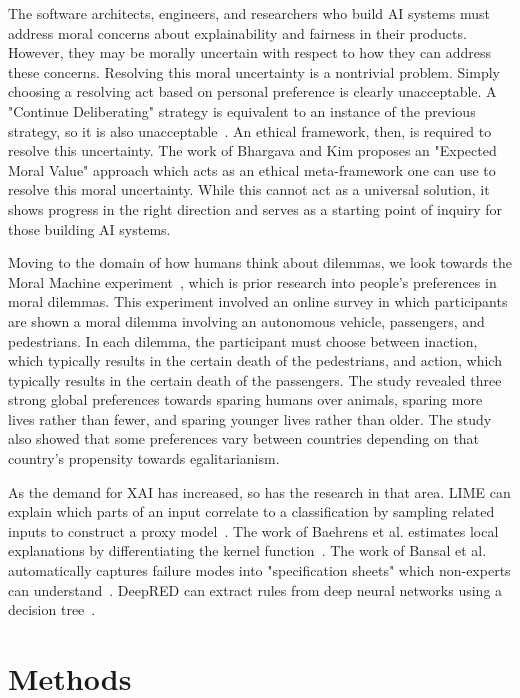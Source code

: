 \documentclass[paper=a4paper]{report}
\begin{document}
The software architects, engineers, and researchers who build AI systems must address moral concerns
about explainability and fairness in their products. However, they may be morally uncertain with
respect to how they can address these concerns. Resolving this moral uncertainty is a nontrivial
problem. Simply choosing a resolving act based on personal preference is clearly unacceptable. A
"Continue Deliberating" strategy is equivalent to an instance of the previous strategy, so it is
also unacceptable~\cite{patrick2017robot}. An ethical framework, then, is required to resolve this
uncertainty. The work of Bhargava and Kim \cite{patrick2017robot} proposes an "Expected Moral Value"
approach which acts as an ethical meta-framework one can use to resolve this moral uncertainty.
While this cannot act as a universal solution, it shows progress in the right direction and serves
as a starting point of inquiry for those building AI systems.

Moving to the domain of how humans think about dilemmas, we look towards the Moral Machine
experiment~\cite{awad2018moral}, which is prior research into people's preferences in moral
dilemmas. This experiment involved an online survey in which participants are shown a moral dilemma
involving an autonomous vehicle, passengers, and pedestrians. In each dilemma, the participant must
choose between inaction, which typically results in the certain death of the pedestrians, and
action, which typically results in the certain death of the passengers. The study revealed three
strong global preferences towards sparing humans over animals, sparing more lives rather than fewer,
and sparing younger lives rather than older. The study also showed that some preferences vary
between countries depending on that country's propensity towards egalitarianism.

As the demand for XAI has increased, so has the research in that area. LIME can explain which parts
of an input correlate to a classification by sampling related inputs to construct a proxy
model~\cite{ribeiro2016should}. The work of Baehrens et al. estimates local explanations by
differentiating the kernel function~\cite{baehrens2010explain}. The work of Bansal et al.
automatically captures failure modes into "specification sheets" which non-experts can
understand~\cite{bansal2014towards}. DeepRED can extract rules from deep neural networks using a
decision tree~\cite{zilke2016deepred}.

\FloatBarrier
\chapter{Methods}
\end{document}
